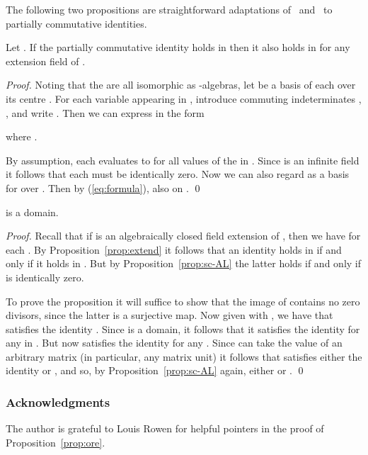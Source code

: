 \documentclass[runningheads]{llncs}
\begin{document}
The following two propositions are straightforward adaptations
of~\cite[Proposition 7.5.5.]{Cohn03} and~\cite[Proposition
  7.7.2]{Cohn03} to partially commutative identities.
\begin{proposition}
Let .  If the partially commutative identity  holds in
 then it also holds in  for any
extension field  of .
\label{prop:extend}
\end{proposition}
\begin{proof}
Noting that the  are all isomorphic as -algebras, let
 be a basis of each  over its centre .
For each variable  appearing in , introduce commuting
indeterminates , , and write
.  Then we can express  in the form

where .

By assumption, each  evaluates to  for all values of the
 in .  Since  is an infinite field it follows that each
 must be identically zero.  Now we can also regard
 as a basis for  over .
Then by (\ref{eq:formula}),  also on .  \qed
\end{proof}

\begin{proposition}

  is a domain.
\label{prop:domain}
\end{proposition}
\begin{proof}
Recall that if  is an algebraically closed field extension of ,
then we have  for each .  By
Proposition~\ref{prop:extend} it follows that an identity  holds
in  if and only if it holds in .  But by
Proposition~\ref{prop:sc-AL} the latter holds if and only if
 is identically zero.

To prove the proposition it will suffice to show that the image of
 contains no zero divisors, since the latter is a surjective map.
Now given  with , we have that  satisfies the identity .  Since  is a domain, it follows that it satisfies the identity
 for any  in .  But now  satisfies the identity  for any .  Since  can
take the value of an arbitrary matrix (in particular, any matrix unit)
it follows that  satisfies
either the identity  or , and so, by
Proposition~\ref{prop:sc-AL} again, either  or
.  \qed
\end{proof}

\subsubsection{Acknowledgments}
The author is grateful to Louis Rowen for helpful pointers in the
proof of Proposition~\ref{prop:ore}.
\end{document}
